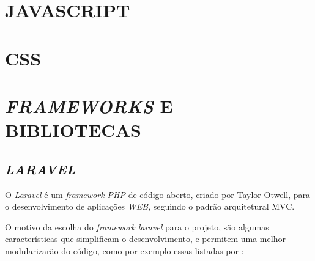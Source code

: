 \section{JAVASCRIPT}

\section{CSS}

\section{\textit{FRAMEWORKS} E BIBLIOTECAS}

\subsection{\textit{LARAVEL}}
O \textit{Laravel} é um \textit{framework PHP} de código aberto, criado por Taylor Otwell, para o desenvolvimento de aplicações \textit{WEB}, seguindo o padrão arquitetural \ac{MVC}.
\par
O motivo da escolha do \textit{framework laravel} para o projeto, são algumas características que simplificam o desenvolvimento, e permitem uma melhor modularizarão do código, como por exemplo essas listadas por :
